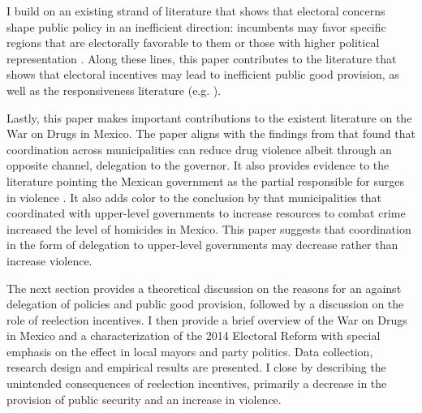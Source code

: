 \documentclass[12pt]{amsart}
\numberwithin{equation}{section}
\theoremstyle{definition}
\theoremstyle{definition}
\theoremstyle{definition}
\begin{document}
I build on an existing strand of literature that shows that electoral concerns shape public policy in an inefficient direction: incumbents may favor specific regions that are electorally favorable to them \citep{schady_2000, Miguel_zaidi_2003, cole_2004, khemani_2007} or those with higher political representation  \citep{wright_1974, porto_2001, ansolabehere_etal_2002}. %
Along these lines, this paper contributes to the literature that shows that electoral incentives may lead to inefficient public good provision, as well as the responsiveness literature (e.g. \citet{besley_burges_2002}). %

Lastly, this paper makes important contributions to the existent literature on the War on Drugs in Mexico. The paper aligns with the findings from \citet{durante_gutierrez_2013} that found that coordination across municipalities can reduce drug violence albeit through an opposite channel, delegation to the governor. It also provides evidence to the literature pointing the Mexican government as the partial responsible for surges in violence \citep{escalante_2011, guerrero_2011}. It also adds color to the conclusion by \citet{dell_2015} that municipalities that coordinated with upper-level governments to increase resources to combat crime increased the level of homicides in Mexico. This paper suggests that coordination in the form of delegation to upper-level governments may decrease rather than increase violence.  

The next section provides a theoretical discussion on the reasons for an against delegation of policies and public good provision, followed by a discussion on the role of reelection incentives. I then provide a brief overview of the War on Drugs in Mexico and a characterization of the 2014 Electoral Reform with special emphasis on the effect in local mayors and party politics. Data collection, research design and empirical results are presented. I close by describing the unintended consequences of reelection incentives, primarily a decrease in the provision of public security and an increase in violence.
     
\end{document}
